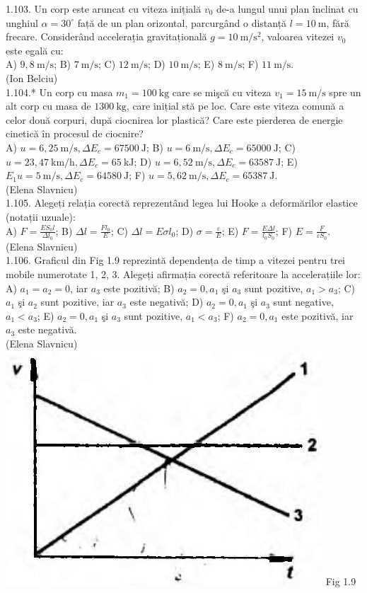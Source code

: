 1.103. Un corp este aruncat cu viteza inițială $v_{0}$ de-a lungul unui plan înclinat cu unghiul $\alpha=30^{\circ}$ față de un plan orizontal, parcurgând o distanță $l=10 \mathrm{~m}$, fără frecare. Considerând accelerația gravitațională $g=10 \mathrm{~m} / \mathrm{s}^{2}$, valoarea vitezei $v_{0}$ este egală cu:\\ A) $9,8 \mathrm{~m} / \mathrm{s}$; B) $7 \mathrm{~m} / \mathrm{s}$; C) $12 \mathrm{~m} / \mathrm{s}$; D) $10 \mathrm{~m} / \mathrm{s}$; E) $8 \mathrm{~m} / \mathrm{s}$; F) $11 \mathrm{~m} / \mathrm{s}$.\\ (Ion Belciu)\\

1.104.* Un corp cu masa $m_{1}=100 \mathrm{~kg}$ care se mişcă cu viteza $v_{1}=15 \mathrm{~m} / \mathrm{s}$ spre un alt corp cu masa de $1300 \mathrm{~kg}$, care inițial stă pe loc. Care este viteza comună a celor două corpuri, după ciocnirea lor plastică? Care este pierderea de energie cinetică în procesul de ciocnire?\\ A) $u=6,25 \mathrm{~m} / \mathrm{s}, \Delta E_{c}=67500 \mathrm{~J}$; B) $u=6 \mathrm{~m} / \mathrm{s}, \Delta E_{c}=65000 \mathrm{~J}$; C) $u=23,47 \mathrm{~km} / \mathrm{h}, \Delta E_{c}=65 \mathrm{~kJ}$; D) $u=6,52 \mathrm{~m} / \mathrm{s}, \Delta E_{c}=63587 \mathrm{~J}$; E) $E_{1} u=5 \mathrm{~m} / \mathrm{s}, \Delta E_{c}=64580 \mathrm{~J}$; F) $u=5,62 \mathrm{~m} / \mathrm{s}, \Delta E_{c}=65387 \mathrm{~J}$.\\ (Elena Slavnicu)\\

1.105. Alegeți relația corectă reprezentând legea lui Hooke a deformărilor elastice (notații uzuale):\\ A) $F=\frac{E S_{0} l}{\Delta l_{0}}$; B) $\Delta l=\frac{F l_{0}}{E}$; C) $\Delta l=E \sigma l_{0}$; D) $\sigma=\frac{\varepsilon}{E}$; E) $F=\frac{E \Delta l}{l_{0} S_{0}}$; F) $E=\frac{F}{\varepsilon S_{0}}$.\\ (Elena Slavnicu)\\

1.106. Graficul din Fig 1.9 reprezintă dependența de timp a vitezei pentru trei mobile numerotate 1, 2, 3. Alegeți afirmația corectă referitoare la accelerațiile lor:\\ A) $a_{1}=a_{2}=0$, iar $a_{3}$ este pozitivă; B) $a_{2}=0, a_{1}$ şi $a_{3}$ sunt pozitive, $a_{1}>a_{3}$; C) $a_{1}$ şi $a_{2}$ sunt pozitive, iar $a_{3}$ este negativă; D) $a_{2}=0, a_{1}$ şi $a_{3}$ sunt negative, $a_{1}<a_{3}$; E) $a_{2}=0, a_{1}$ şi $a_{3}$ sunt pozitive, $a_{1}<a_{3}$; F) $a_{2}=0, a_{1}$ este pozitivă, iar $a_{3}$ este negativă.\\ (Elena Slavnicu)\\ \includegraphics[width=0.4\linewidth]{images/2025_07_01_5b3ff9fa0d508c8e9f17g-025} Fig 1.9\\

